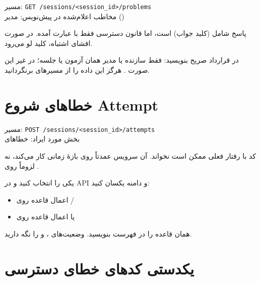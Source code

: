 \documentclass[a4paper,11pt]{article}
\newcommand{\apipath}[1]{\texttt{#1}}
\begin{document}
\begin{apibox}
\noindent مسیر: \apipath{GET /sessions/<session\_id>/problems}\\
مخاطب اعلام‌شده در پیش‌نویس: مدیر ()
\end{apibox}

\begin{problembox}
پاسخ شامل  (کلید جواب) است، اما قانون دسترسی فقط با عبارت
 آمده. در صورت افشای اشتباه، کلید لو می‌رود.
\end{problembox}

\begin{solutionbox}
در قرارداد صریح بنویسید: فقط سازنده یا مدیر همان آزمون یا جلسه؛ در غیر این صورت .
هرگز این داده را از مسیرهای  برنگردانید.
\end{solutionbox}

\section{خطاهای شروع Attempt}

\begin{apibox}
\noindent مسیر: \apipath{POST /sessions/<session\_id>/attempts}\\
بخش مورد ایراد: خطاهای 
\end{apibox}

\begin{problembox}
کد  با رفتار فعلی  ممکن است نخواند.
آن سرویس عمدتاً روی بازهٔ زمانی کار می‌کند، نه لزوماً روی .
\end{problembox}

\begin{solutionbox}
یکی را انتخاب کنید و در API و دامنه یکسان کنید:
\begin{itemize}
  \item اعمال قاعده روی /
  \item یا اعمال قاعده روی 
\end{itemize}
همان قاعده را در فهرست  بنویسید.
وضعیت‌های ،  و  را نگه دارید.
\end{solutionbox}

\section{یکدستی کدهای خطای دسترسی}
\end{document}
